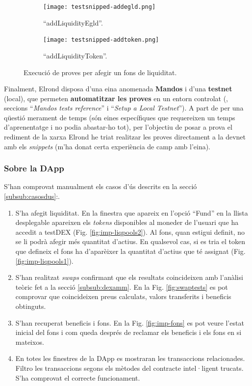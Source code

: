 \documentclass[11pt,a4paper]{article}
\begin{document}
\begin{figure}[!htb]
	\begin{subfigure}[b]{0.5\textwidth}
	  \texttt{[image: testsnipped-addegld.png]}
	  \caption{``addLiquidityEgld''.}\label{fig:test-addegld}
	\end{subfigure}\hfill
	\begin{subfigure}[b]{0.47\textwidth}
	  \texttt{[image: testsnipped-addtoken.png]}
	  \caption{``addLiquidityToken''.}\label{fig:test-addtoken}
	\end{subfigure}\hfill
	\caption{Execució de proves per afegir un fons de liquiditat.}
\end{figure}

Finalment, Elrond disposa d'una eina anomenada \textbf{Mandos} i d'una \textbf{testnet} (local), que permeten \textbf{automatitzar les proves} en un entorn controlat (\cite{elrond2022}, seccions ``\textit{Mandos tests reference}'' i  ``\textit{Setup a Local Testnet}''). A part de per una qüestió merament de temps (són eines específiques que requereixen un temps d'aprenentatge i no podia abastar-ho tot), per l'objectiu de posar a prova el rediment de la xarxa Elrond he triat realitzar les proves directament a la devnet amb els \textit{snippets} (m'ha donat certa experiència de camp amb l'eina). 

\subsubsection{Sobre la DApp}
S'han comprovat manualment els casos d'ús descrits en la secció \ref{subsub:casosdus}:.
\begin{enumerate}
\item S'ha afegit liquiditat. En la finestra que apareix en l'opció ``Fund'' en la llista desplegable apareixen els \textit{tokens} disponibles al moneder de l'usuari que ha accedit a testDEX (Fig. \ref{fig:imp-liqpools2}). Al fons, quan estigui definit, no se li podrà afegir més quantitat d'actius. En qualsevol cas, si es tria el token que defineix el fons ha d'aparèixer la quantitat d'actius que té assignat (Fig. \ref{fig:imp-liqpools1}).
\item S'han realitzat \textit{swaps} confirmant que els resultats coincideixen amb l'anàlisi teòric fet a la secció \ref{subsub:dexamm}. En la Fig. \ref{fig:swaptests} es pot comprovar que coincideixen preus calculats, valors transferits i beneficis obtinguts.
\item S'han recuperat beneficis i fons. En la Fig. \ref{fig:imp-fons} es pot veure l'estat inicial del fons i com queda després de reclamar els beneficis i els fons en si mateixos.
\item En totes les finestres de la DApp es mostraran les transaccions relacionades. Filtro les transaccions segons els mètodes del contracte intel·ligent trucats. S'ha comprovat el correcte funcionament.
\end{enumerate}
\end{document}
